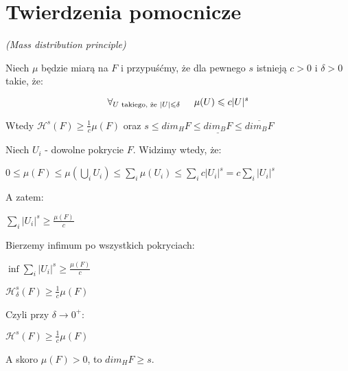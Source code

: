 \documentclass{mini}
\begin{document}
\chapter{Twierdzenia pomocnicze}


\begin{tw}{\textit{(Mass distribution principle)}}\label{mass}

Niech $\mu$ będzie miarą na $F$ i przypuśćmy, że dla pewnego $s$ istnieją $c>0$ i $\delta>0$ takie, że:

\begin{equation}
\forall_{U \hspace{1mm}\textrm{takiego, że} \hspace{1mm} |U|\leqslant \delta} \hspace{5mm} \mu (U) \leqslant c|U|^s
\end{equation}   

Wtedy $\mathcal{H}^s(F)\geqslant \frac{1}{c} \mu (F)$ oraz $s \leqslant dim_{H}F \leqslant \underline{dim_BF} \leqslant \overline{dim_BF}$

\end{tw}


\begin{dow}

Niech $U_i$ - dowolne pokrycie $F$. Widzimy wtedy, że:

$ 0 \leq \mu (F) \leqslant \mu( \bigcup_i U_i ) \leqslant \sum_i \mu (U_i) \leqslant \sum_i c|U_i|^s = c \sum_i |U_i|^s $

A zatem: 

$ \sum_i |U_i|^s \geqslant \frac{\mu(F)}{c} $

Bierzemy infimum po wszystkich pokryciach:

$ \inf \sum_i |U_i|^s \geqslant \frac{\mu(F)}{c} $

$ \mathcal{H}^s_{\delta} (F) \geqslant \frac{1}{c} \mu (F) $

Czyli przy $ \delta \rightarrow 0^+ $:

$ \mathcal{H}^s (F) \geqslant \frac{1}{c} \mu (F) $

A skoro $ \mu(F)>0 $, to $dim_HF \geqslant s$. 

\end{dow}

\end{document}
